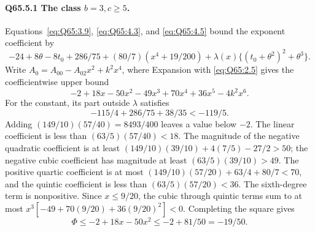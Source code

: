 \paragraph{Q65.5.1 The class \(b=\allowbreak 3,\allowbreak c\ge\allowbreak 5\).}
Equations~\eqref{eq:Q65:3.9}, \eqref{eq:Q65:4.3}, and
\eqref{eq:Q65:4.5} bound the exponent coefficient by
\begin{equation}\tag{Q65.5.2}\label{eq:Q65:5.2}
-24+8\theta-8t_0+286/75+(80/7)(x^4+19/200)
 +\lambda(x)\{(t_0+\theta^2)^2+\theta^3\}.
\end{equation}
Write \(A_0=\allowbreak A_{00}-A_{02}x^2+k^2x^4\), where
Expansion with \eqref{eq:Q65:2.5} gives the coefficientwise upper bound
\begin{equation}\tag{Q65.5.3}\label{eq:Q65:5.3}
-2+18x-50x^2-49x^3+70x^4+36x^5-4k^2x^6.
\end{equation}
For the constant, its part outside \(\lambda\) satisfies
\[
-115/4+286/75+38/35<-119/5.
\]
Adding \((149/10)(57/40)=\allowbreak 8493/400\) leaves a value below \(-2\).
The linear coefficient is less than \((63/5)(57/40)<\allowbreak 18\).
The magnitude of the negative quadratic coefficient is at least
\((149/10)(39/10)+4(7/5)-27/2>\allowbreak 50\); the negative cubic coefficient
has magnitude at least \((63/5)(39/10)>\allowbreak 49\).
The positive quartic coefficient is at most
\((149/10)(57/20)+63/4+80/7<\allowbreak 70\), and the quintic coefficient is
less than \((63/5)(57/20)<\allowbreak 36\). The sixth-degree term is nonpositive.
Since \(x\le\allowbreak 9/20\), the cubic through quintic terms sum to at most
\(x^3[-49+70(9/20)+36(9/20)^2]<\allowbreak 0\). Completing the square gives
\begin{equation}\tag{Q65.5.4}\label{eq:Q65:5.4}
\Phi\le-2+18x-50x^2\le-2+81/50=-19/50.
\end{equation}

